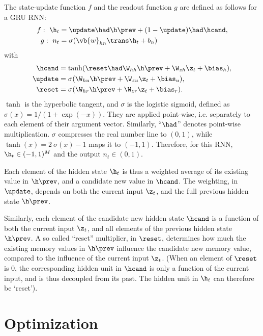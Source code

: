 The state-update function $f$ and the readout function $g$ are defined as follows for a GRU RNN:
%
\begin{align}
f:\ \h_t     &= \update \had \h\prev 
                + (1-\update) \had \hcand, \label{eq:hnew}\\
g:\ n_t  &= \sigma( \vb{w}_{hn}\trans \h_t + b_n )      \label{eq:out}\\
\end{align}
with
\begin{align}
\hcand  &= \tanh( \reset \had \W_{hh} \h\prev 
                   + \W_{zh} \z_t + \bias_h ),  \label{eq:hcand}\\
\update &= \sigma( \W_{hu} \h\prev 
                   + \W_{zu} \z_t + \bias_u),   \label{eq:update}\\
\reset  &= \sigma( \W_{hr} \h\prev 
                   + \W_{zr} \z_t + \bias_r ).  \label{eq:reset}
\end{align}
$\tanh$ is the hyperbolic tangent, and $\sigma$ is the logistic sigmoid, defined as $\sigma(x) = 1 / (1 + \exp(-x))$. They are applied point-wise, i.e. separately to each element of their argument vector. Similarly, ``$\had$'' denotes point-wise multiplication.  $\sigma$ compresses the real number line to $(0, 1)$, while $\tanh(x) = 2\ \sigma(x) - 1$ maps it to $(-1, 1)$. Therefore, for this RNN, $\h_t \in (-1, 1)^M$ and the output $n_t \in (0, 1)$.

Each element of the hidden state $\h_t$ is thus a weighted average of its existing value in $\h\prev$, and a candidate new value in $\hcand$. The weighting, in $\update$, depends on both the current input $\z_t$, and the full previous hidden state $\h\prev$.

Similarly, each element of the candidate new hidden state $\hcand$ is a function of both the current input $\z_t$, and all elements of the previous hidden state $\h\prev$. A so called ``reset'' multiplier, in $\reset$, determines how much the existing memory values in $\h\prev$ influence the candidate new memory value, compared to the influence of the current input $\z_t$. (When an element of $\reset$ is $0$, the corresponding hidden unit in $\hcand$ is only a function of the current input, and is thus decoupled from its past. The hidden unit in $\h_t$ can therefore be `reset').


% 


\section{Optimization}
\label{sec:RNN-optim}



